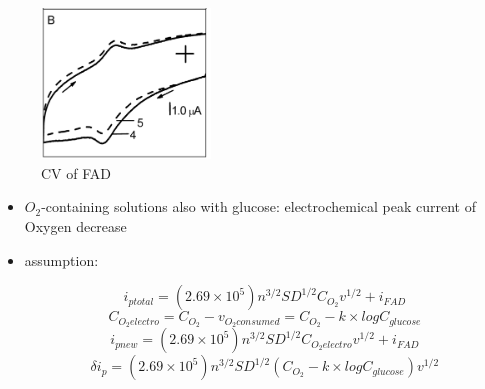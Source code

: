 \documentclass[fontsize=11pt,aspectratio=169,t,fleqn]{beamer}
\begin{document}
\begin{frame}
  \begin{figure}[h!]
    \centering
    
       \includegraphics[width=0.4\textwidth]{fig/solutionwithglucose.png}
       \caption{CV of FAD}
    \end{figure}
    \begin{itemize}
      \item $O_2$-containing solutions also with glucose: electrochemical peak current of Oxygen decrease
     \end{itemize}
\end{frame}
\begin{frame}
  \begin{itemize}
    \item assumption:
 
  \begin{equation} 
    i_{ptotal} =(2.69 \times 10^5)n^{3/2}SD^{1/2}C_{O_2}v^{1/2} + i_{FAD}
    \end{equation}
    \begin{equation}
       C_{O_2electro}= C_{O_2}- v_{O_2consumed}= C_{O_2} - k \times log C_{glucose}
    \end{equation}
    \begin{equation}
       i_{pnew} = (2.69 \times 10^5)n^{3/2}SD^{1/2}C_{O_2electro}v^{1/2} + i_{FAD}
    \end{equation}
    \begin{equation}
       \delta i_{p} = (2.69 \times 10^5)n^{3/2}SD^{1/2} (C_{O_2} - k \times log C_{glucose})v^{1/2}
    \end{equation}
  \end{itemize}
\end{frame}
\end{document}
